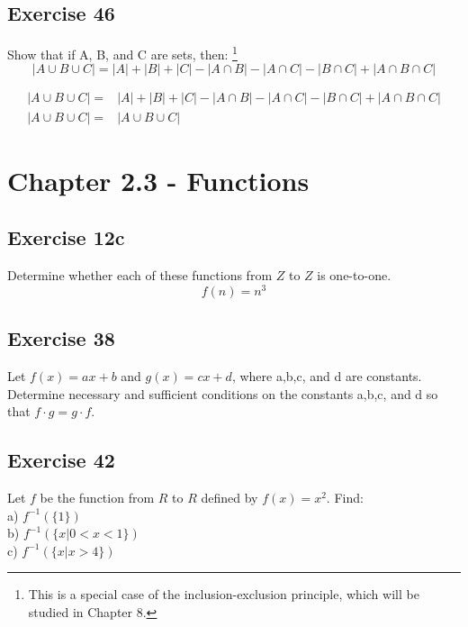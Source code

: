 \documentclass[12pt]{article}
\begin{document}
    \subsection{Exercise 46}
    Show that if A, B, and C are sets, then:
    \footnote{This is a special case of the inclusion-exclusion principle, which will be studied in Chapter 8.}
    \begin{equation}
        |A \cup B \cup C| = 
        |A| + |B| + |C| - |A \cap B| - |A \cap C| - |B \cap C| + |A \cap B \cap C|
    \end{equation}

    \begin{equation}
        \begin{split}
            |A \cup B \cup C| =& 
              |A| + |B| + |C| - |A \cap B| 
            - |A \cap C| - |B \cap C| + |A \cap B \cap C|       
            \\
            |A \cup B \cup C| =& 
            |A \cup B \cup C|
        \end{split}
    \end{equation}

    \section{Chapter 2.3 - Functions}
    \subsection{Exercise 12c}
    Determine whether each of these functions from $Z$ to $Z$ is one-to-one.
        \begin{equation}
            f(n) = n^3
        \end{equation}

    \subsection{Exercise 38}
    Let $f(x) = ax+b$ and $g(x)= cx+d$, where a,b,c, and d are constants. Determine necessary and sufficient conditions on the constants a,b,c, and d so that $f \cdot g = g \cdot f$. 
    \subsection{Exercise 42}
    Let $f$ be the function from $R$ to $R$ defined by $f(x)=x^2$. Find:\\
    a) $f^{-1}(\{1\})$\\
    b) $f^{-1}(\{ x | 0 < x < 1\})$\\
    c) $f^{-1}(\{ x | x > 4\})$
    
\end{document}
